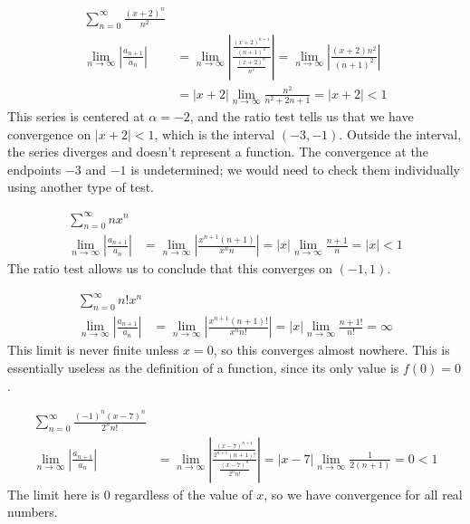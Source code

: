 \documentclass[fleqn]{report}
\begin{document}
\begin{example}
\begin{align*}
\sum_{n=0}^\infty \frac{(x+2)^n}{n^2} & \\
\lim_{n \rightarrow \infty} \left| \frac{a_{n+1}}{a_n} \right| &
= \lim_{n \rightarrow \infty} \left|
\frac{\frac{(x+2)^{n+1}}{(n+1)^2}}{\frac{(x+2)^n}{n^2}} \right| 
= \lim_{n \rightarrow \infty} \left| \frac{(x+2)n^2}{(n+1)^2}
\right| \\
& = |x+2| \lim_{n \rightarrow \infty} \frac{n^2}{n^2+2n+1} =
|x+2| < 1
\end{align*}
This series is centered at $\alpha=-2$, and the ratio test tells us
that we have convergence on $|x+2|<1$, which is the interval
$(-3,-1)$. Outside the interval, the series diverges and
doesn't represent a function. 
The convergence at the endpoints $-3$ and $-1$ is
undetermined; we would need to check them individually using
another type of test.
\end{example}

\begin{example}
\begin{align*}
\sum_{n=0}^\infty nx^n & \\
\lim_{n \rightarrow \infty} \left| \frac{a_{n+1}}{a_n} \right| &
= \lim_{n \rightarrow \infty} \left|
\frac{x^{n+1} (n+1)}{x^n n} \right|
= |x| \lim_{n \rightarrow \infty} \frac{n+1}{n} = |x| < 1
\end{align*}
The ratio test allows us to conclude that this converges on
$(-1,1)$.
\end{example}

\begin{example}
\begin{align*}
\sum_{n=0}^\infty n!x^n & \\
\lim_{n \rightarrow \infty} \left| \frac{a_{n+1}}{a_n} \right| &
= \lim_{n \rightarrow \infty} \left|
\frac{x^{n+1} (n+1)!}{x^n n!} \right| 
= |x| \lim_{n \rightarrow \infty} \frac{n+1!}{n!} = \infty
\end{align*}
This limit is never finite unless $x=0$, so this converges
almost nowhere. This is essentially useless as the definition
of a function, since its only value is $f(0) = 0$.
\end{example}

\begin{example}
\begin{align*}
\sum_{n=0}^\infty \frac{(-1)^n (x-7)^n}{2^n n!} & \\
\lim_{n \rightarrow \infty} \left| \frac{a_{n+1}}{a_n} \right| 
& = \lim_{n \rightarrow \infty} \left|
\frac{\frac{(x-7)^{n+1}}{2^{n+1} (n+1)!}}{\frac{(x-7)^n}{2^n
n!}} \right| = |x-7|\lim_{n \rightarrow \infty}
\frac{1}{2(n+1)} = 0 < 1 
\end{align*}
The limit here is $0$ regardless of the value of $x$, so we have
convergence for all real numbers.
\end{example}
\end{document}
